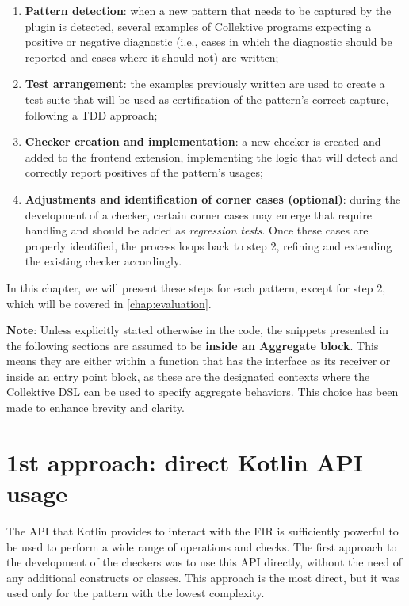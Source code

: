 \documentclass[12pt,a4paper,openright,twoside]{book}
\begin{document}
\begin{enumerate}
  \item \textbf{Pattern detection}: when a new pattern that needs to be captured
  by the plugin is detected, several examples of Collektive programs expecting a
  positive or negative diagnostic (i.e., cases in which the diagnostic should be
  reported and cases where it should not) are written;
  \item \textbf{Test arrangement}: the examples previously written are used to 
  create a test suite that will be used as certification of the pattern's correct
  capture, following a \ac{TDD} approach;
  \item \textbf{Checker creation and implementation}: a new checker is created and
  added to the frontend extension, implementing the logic that will detect and 
  correctly report positives of the pattern's usages;
  \item \textbf{Adjustments and identification of corner cases (optional)}:
  during the development of a checker, certain corner cases may emerge that
  require handling and should be added as \emph{regression tests}. Once these
  cases are properly identified, the process loops back to step 2, refining and
  extending the existing checker accordingly.
\end{enumerate}

In this chapter, we will present these steps for each pattern, except for step
2, which will be covered in \cref{chap:evaluation}.

\textbf{Note}: Unless explicitly stated otherwise in the code, the snippets
presented in the following sections are assumed to be \textbf{inside an
Aggregate block}. This means they are either within a function that has the
 interface as its receiver or inside an  entry
point block, as these are the designated contexts where the Collektive \ac{DSL}
can be used to specify aggregate behaviors. This choice has been made to enhance
brevity and clarity.

\section{1st approach: direct Kotlin API usage}

The API that Kotlin provides to interact with the \ac{FIR} is sufficiently
powerful to be used to perform a wide range of operations and checks. The first
approach to the development of the checkers was to use this API directly,
without the need of any additional constructs or classes. This approach is the
most direct, but it was used only for the pattern with the lowest complexity.
\end{document}
